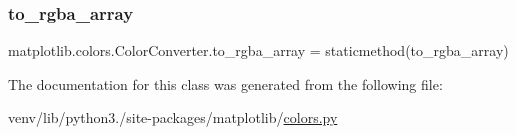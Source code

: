 \mbox{\label{classmatplotlib_1_1colors_1_1ColorConverter_a011ab7a168439f586e4961a360fd91e3}} 
\subsubsection{\texorpdfstring{to\+\_\+rgba\+\_\+array}{to\_rgba\_array}}
{\footnotesize\ttfamily matplotlib.\+colors.\+Color\+Converter.\+to\+\_\+rgba\+\_\+array = staticmethod(to\+\_\+rgba\+\_\+array)\hspace{0.3cm}{\ttfamily [static]}}



The documentation for this class was generated from the following file\+:\begin{DoxyCompactItemize}
\item 
venv/lib/python3./site-\/packages/matplotlib/\hyperlink{colors_8py}{colors.\+py}\end{DoxyCompactItemize}
